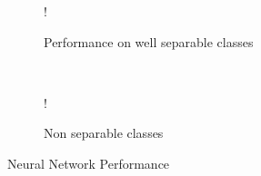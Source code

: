 \documentclass[11pt]{article}
\begin{document}
\begin{center}

\end{center}

\begin{figure}[!h]
    \centering 
    \begin{subfigure}[b]{0.20\textwidth}
       	\resizebox {\textwidth} {!} { }
        \caption{Performance on well separable classes}
        \label{fig:boundary-separable}
    \end{subfigure}
    ~
    \begin{subfigure}[b]{0.20\textwidth}
       	\resizebox {\textwidth} {!} { }
        \caption{Non separable classes}
        \label{fig:nscls}
    \end{subfigure}
    \caption{Neural Network Performance}\label{fig:nnperformance}
\end{figure}
\end{document}
